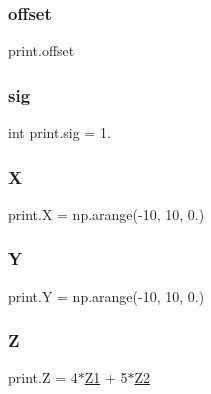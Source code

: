 \mbox{\label{namespaceprint_a63b63e4e6ea6a9b03c0e161424d919e8}} 
\subsubsection{\texorpdfstring{offset}{offset}}
{\footnotesize\ttfamily print.\+offset}

\mbox{\label{namespaceprint_a1efc77cd3bf0d758b07ec8e2b2c71c6b}} 
\subsubsection{\texorpdfstring{sig}{sig}}
{\footnotesize\ttfamily int print.\+sig = 1.}

\mbox{\label{namespaceprint_affd04964e07d6931f5b7f92164b9b99f}} 
\subsubsection{\texorpdfstring{X}{X}}
{\footnotesize\ttfamily print.\+X = np.\+arange(-\/10, 10, 0.)}

\mbox{\label{namespaceprint_aab512732eb82cbe258baa68f9f9add63}} 
\subsubsection{\texorpdfstring{Y}{Y}}
{\footnotesize\ttfamily print.\+Y = np.\+arange(-\/10, 10, 0.)}

\mbox{\label{namespaceprint_a9433aedd977f6182d23edaf955e46742}} 
\subsubsection{\texorpdfstring{Z}{Z}}
{\footnotesize\ttfamily print.\+Z = 4$\ast$\mbox{\hyperlink{namespaceprint_acc02b068ba7893cb51896817458953b1}{Z1}} + 5$\ast$\mbox{\hyperlink{namespaceprint_a09064592a1be5db47dee477a81ae8bf3}{Z2}}}

\mbox{\label{namespaceprint_acc02b068ba7893cb51896817458953b1}} 
